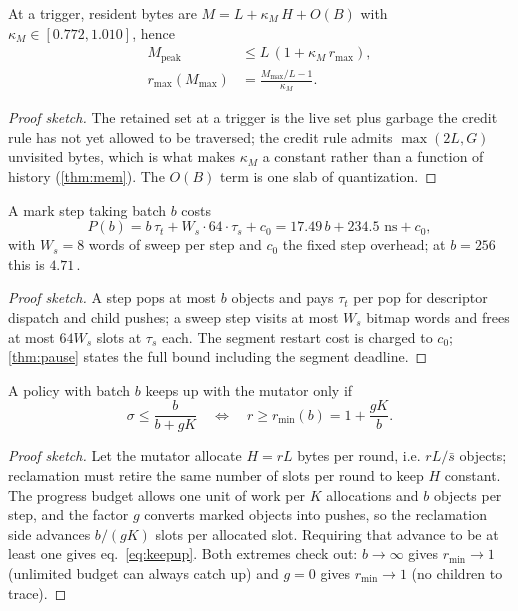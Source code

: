 \begin{theorem}
\label{thm:memlaw}
At a trigger, resident bytes are $M = L + \kappa_M\,H + O(B)$ with
$\kappa_M \in [0.772, 1.010]$, hence
\begin{equation}
\begin{aligned}
M_{\text{peak}} &\le L\,(1 + \kappa_M\, r_{\max}),\\
r_{\max}(M_{\max}) &= \frac{M_{\max}/L - 1}{\kappa_M}.
\end{aligned}
\label{eq:memlaw}
\end{equation}
\end{theorem}
\begin{proof}[Proof sketch]
The retained set at a trigger is the live set plus garbage the credit rule has not yet allowed to be
traversed; the credit rule admits $\max(2L, G)$ unvisited bytes, which is what makes $\kappa_M$ a
constant rather than a function of history (\thm\ref{thm:mem}).
The $O(B)$ term is one slab of quantization.
\end{proof}

\begin{theorem}
\label{thm:pauselaw}
A mark step taking batch $b$ costs
\begin{equation}
\label{eq:pauselaw}
P(b) = b\,\tau_t + W_s \cdot 64 \cdot \tau_s + c_0
= 17.49\,b + 234.5\text{ ns} + c_0,
\end{equation}
with $W_s = 8$ words of sweep per step and $c_0$ the fixed step overhead; at $b = 256$ this is
$4.71$\,\us.
\end{theorem}
\begin{proof}[Proof sketch]
A step pops at most $b$ objects and pays $\tau_t$ per pop for descriptor dispatch and child pushes;
a sweep step visits at most $W_s$ bitmap words and frees at most $64 W_s$ slots at $\tau_s$ each.
The segment restart cost is charged to $c_0$; \thm\ref{thm:pause} states the full bound including the
segment deadline.
\end{proof}

\begin{theorem}
\label{thm:keepup}
A policy with batch $b$ keeps up with the mutator only if
\begin{equation}
\label{eq:keepup}
\sigma \le \frac{b}{b + gK}
\quad\Longleftrightarrow\quad
r \ge r_{\min}(b) = 1 + \frac{gK}{b}.
\end{equation}
\end{theorem}
\begin{proof}[Proof sketch]
Let the mutator allocate $H = rL$ bytes per round, i.e. $rL/\bar{s}$ objects; reclamation must retire
the same number of slots per round to keep $H$ constant.
The progress budget allows one unit of work per $K$ allocations and $b$ objects per step, and the
factor $g$ converts marked objects into pushes, so the reclamation side advances $b/(gK)$ slots per
allocated slot.
Requiring that advance to be at least one gives eq.~\ref{eq:keepup}.
Both extremes check out: $b \to \infty$ gives $r_{\min} \to 1$ (unlimited budget can always catch
up) and $g = 0$ gives $r_{\min} \to 1$ (no children to trace).
\end{proof}


